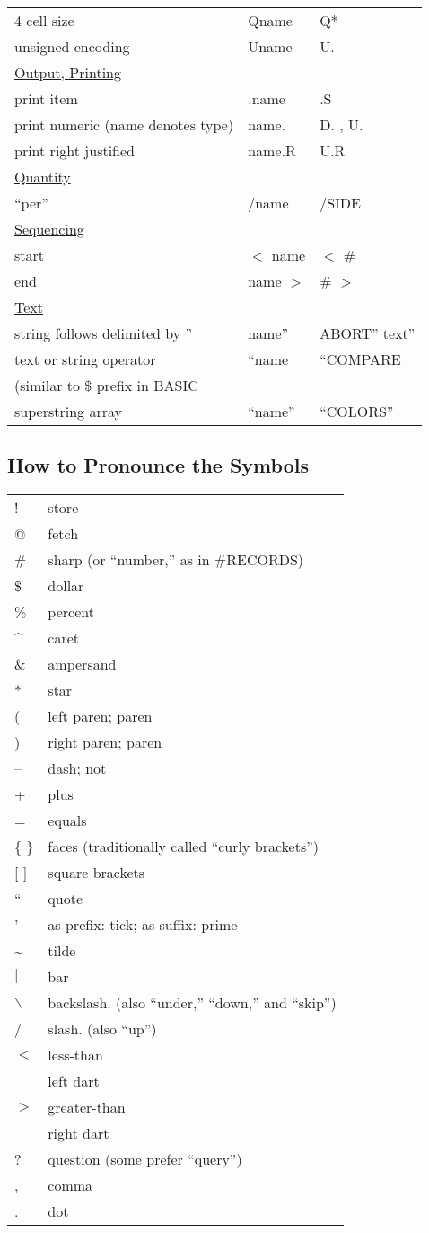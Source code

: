 \begin{longtable}{lll}
4 cell size&Qname&Q*\\
unsigned encoding&Uname&U.\\[1ex]
\underline{Output, Printing}\\
print item&.name&.S\\
print numeric (name denotes type)&name.&D. , U.\\
print right justified&name.R&U.R\\[1ex]
\underline{Quantity}\\
``per''&/name&/SIDE\\[1ex]
\underline{Sequencing}\\
start&\(<\) name&\(<\) \#\\
end&name \(>\)&\# \(>\)\\[1ex]
\underline{Text}\\
string follows delimited by ''&name''&ABORT'' text''\\
text or string operator&``name&``COMPARE\\
(similar to \$ prefix in BASIC\\
superstring array&``name''&``COLORS''\\
\end{longtable}

\subsection{How to Pronounce the Symbols}
\begin{tabular}{ll}
{}{\setlength{\parsep}{0cm}}
!&store\\
@&fetch\\
\#&sharp (or ``number,'' as in \#RECORDS)\\
\$&dollar\\
\%&percent\\
\^{ }&caret\\
\&&ampersand\\
{*}&star\\
(&left paren; paren\\
)&right paren; paren\\
--&dash; not\\
+&plus\\
=&equals\\
\{ \}&faces (traditionally called ``curly brackets'')\\
{[} {]}&square brackets\\
``&quote\\
'&as prefix: tick; as suffix: prime\\
\~{ }&tilde\\
\(|\)&bar\\
\(\backslash\)&backslash. (also ``under,'' ``down,'' and ``skip'')\\
/&slash. (also ``up'')\\
\(<\)&less-than\\
 &left dart\\
\(>\)&greater-than\\
 &right dart\\
?&question (some prefer ``query'')\\
,&comma\\
.&dot\\
\end{tabular}

